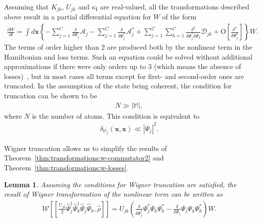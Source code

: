 \documentclass[12pt,aip,jmp,amssymb,amsmath]{revtex4-1}
\newcommand{\lvec}{\boldsymbol{l}}
\newcommand{\xvec}{\boldsymbol{x}}
\newcommand{\Psiop}{\hat{\Psi}}
\newcommand{\restbasis}{\mathbb{M}}
\newcommand{\thmref}[1]{Theorem~\ref{thm:#1}}
\newtheorem{lemma}{Lemma}
\begin{document}
Assuming that $K_{jk}$, $U_{jk}$ and $\kappa_{\lvec}$ are real-valued, all the transformations described above result in a partial differential equation for $W$ of the form
\begin{equation}\begin{split}
    \frac{\partial W}{\partial t} = \int d\xvec \left\{
        - \sum_{j=1}^C \frac{\delta}{\delta \Psi_j} \mathcal{A}_j
        - \sum_{j=1}^C \frac{\delta}{\delta \Psi_j^*} \mathcal{A}_j^*
        + \sum_{j=1}^C \sum_{k=1}^C \frac{\delta^2}{\delta \Psi_j^* \delta \Psi_k} \mathcal{D}_{jk}
        + \mbox{O} \left[ \frac{\delta^3}{\delta\Psi_j^3} \right]
    \right\} W.
\end{split}\end{equation}
The terms of order higher than 2 are produced both by the nonlinear term in the Hamiltonian and loss terms.
Such an equation could be solved without additional approximations if there were only orders up to 3 (which means the absence of losses)~\cite{Polkovnikov2003}, but in most cases all terms except for first- and second-order ones are truncated.
In the assumption of the state being coherent, the condition for truncation can be shown to be~\cite{Sinatra2002}
\begin{equation}\begin{split}
    N \gg |\restbasis|,
\end{split}\end{equation}
where $N$ is the number of atoms.
This condition is equivalent to~\cite{Norrie2006}
\begin{equation}\begin{split}
    \delta_{\restbasis_j}(\xvec, \xvec) \ll | \Psi_j |^2.
\end{split}\end{equation}

Wigner truncation allows us to simplify the results of \thmref{transformations:w-commutator2} and \thmref{transformations:w-losses}.

\begin{lemma}
    Assuming the conditions for Wigner truncation are satisfied,
    the result of Wigner transformation of the nonlinear term can be written as
    \begin{equation*}\begin{split}
        \mathcal{W} \left[
            [
                \frac{U_{jk}}{2}
                    \Psiop_j^\dagger \Psiop_k^\dagger \Psiop_j \Psiop_k,
                \hat{\rho}
            ]
        \right]
        = U_{jk} \left(
            \frac{\delta}{\delta \Psi_j^*} \Psi_j^* \Psi_k \Psi_k^*
            - \frac{\delta}{\delta \Psi_j} \Psi_j \Psi_k \Psi_k^*
        \right) W.
    \end{split}\end{equation*}
\end{lemma}
\end{document}
